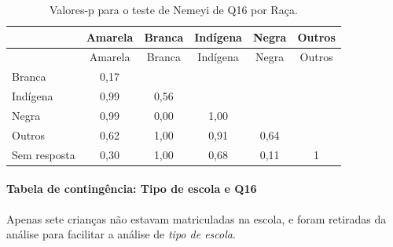 \documentclass[]{article}
\let\oldparagraph\paragraph
\renewcommand{\paragraph}[1]{\oldparagraph{#1}\mbox{}}
\begin{document}
\begin{longtable}[]{@{}lccccc@{}}
\caption{\label{tab:unnamed-chunk-170}Valores-p para o teste de Nemeyi de Q16 por Raça.}\tabularnewline
\toprule
& Amarela & Branca & Indígena & Negra & Outros\tabularnewline
\midrule
\endfirsthead
\toprule
& Amarela & Branca & Indígena & Negra & Outros\tabularnewline
\midrule
\endhead
Branca & 0,17 & & & &\tabularnewline
Indígena & 0,99 & 0,56 & & &\tabularnewline
Negra & 0,99 & 0,00 & 1,00 & &\tabularnewline
Outros & 0,62 & 1,00 & 0,91 & 0,64 &\tabularnewline
Sem resposta & 0,30 & 1,00 & 0,68 & 0,11 & 1\tabularnewline
\bottomrule
\end{longtable}

\cleardoublepage

\hypertarget{tabela-de-continguxeancia-tipo-de-escola-e-q16}{%
\paragraph{Tabela de contingência: Tipo de escola e Q16}\label{tabela-de-continguxeancia-tipo-de-escola-e-q16}}

Apenas sete crianças não estavam matriculadas na escola, e foram retiradas da análise para facilitar a análise de \emph{tipo de escola}.
\end{document}
